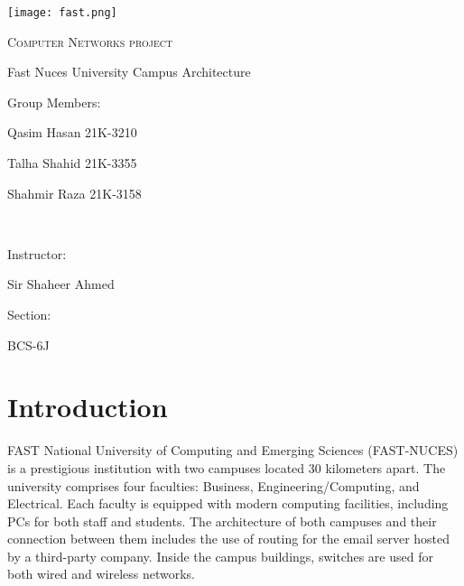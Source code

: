 \documentclass[12pt]{article}
\begin{document}
\begin{titlepage}
    \centering
    \texttt{[image: fast.png]}\par\vspace{0.9cm}
    
    {\scshape\large {{Computer Networks project}} \par}
    \vspace{0.1cm}
    { {\Huge {Fast Nuces University Campus Architecture\\}} \par}
      \vspace{1.5cm}
    { Group Members: \par}
    \vspace{0.1cm}
    {\large Qasim Hasan 21K-3210 \par}
    {\large Talha Shahid 21K-3355 \par}
    {\large Shahmir Raza 21K-3158 \par}
    {\ \par}
    \vspace{1.0cm}
    {\large Instructor: \par}
    \vspace{0.1cm}
    {\large Sir Shaheer Ahmed \par}
    \vspace{1cm}
    {\large Section: \par}
    \vspace{0.1cm}
    {\large BCS-6J \par}
\end{titlepage}

\tableofcontents
\thispagestyle{empty}

\newpage

\section{Introduction}
FAST National University of Computing and Emerging Sciences (FAST-NUCES) is a prestigious institution with two campuses located 30 kilometers apart. The university comprises four faculties: Business, Engineering/Computing, and Electrical. Each faculty is equipped with modern computing facilities, including PCs for both staff and students. The architecture of both campuses and their connection between them includes the use of routing for the email server hosted by a third-party company. Inside the campus buildings, switches are used for both wired and wireless networks.
\end{document}
